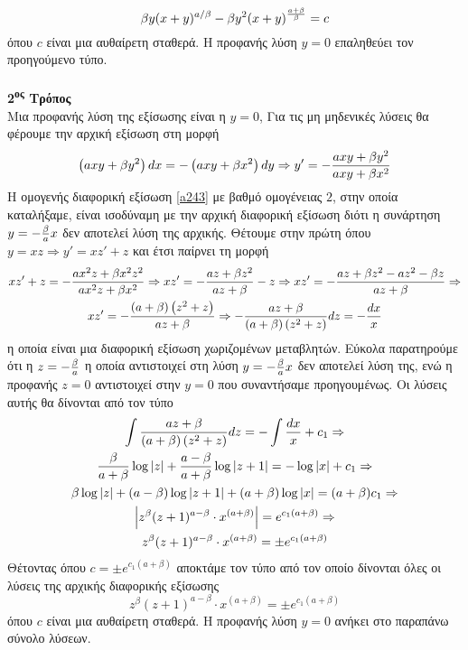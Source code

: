 \documentclass[a4paper,twoside,11pt]{book}
\newcommand{\epask}{\\\\\\}
\DeclareRobustCommand{\frac}[3][0pt]{%
{\begingroup\hspace{#1}#2\hspace{#1}\endgroup\over\hspace{#1}#3\hspace{#1}}}
\newcommand{\tss}[1]{\textsuperscript{#1}}
\begin{document}
\[ \beta y(x+y)^{a/\beta}-\beta y^2(x+y)^{\frac{a+\beta}{\beta}}=c\]
όπου $ c $ είναι μια αυθαίρετη σταθερά. Η προφανής λύση $ y=0 $ επαληθεύει τον προηγούμενο τύπο.\\\\
\textbf{2\tss{ος} Τρόπος}\\
Μια προφανής λύση της εξίσωσης είναι η $ y=0 $, Για τις μη μηδενικές λύσεις θα φέρουμε την αρχική εξίσωση στη μορφή
\begin{equation}\label{a243}
\left( axy+\beta y^2\right)dx=-\left(axy+\beta x^2\right)dy\Rightarrow y'=-\frac{axy+\beta y^2}{axy+\beta x^2}
\end{equation}
Η ομογενής διαφορική εξίσωση \eqref{a243} με βαθμό ομογένειας $2$, στην οποία καταλήξαμε, είναι ισοδύναμη με την αρχική διαφορική εξίσωση διότι η συνάρτηση $ y=-\frac{\beta}{a}x $ δεν αποτελεί λύση της αρχικής. Θέτουμε στην πρώτη όπου $ y=xz\Rightarrow y'=xz'+z $ και έτσι παίρνει τη μορφή
\begin{gather*}
xz'+z=-\frac{ax^2z+\beta x^2z^2}{ax^2z+\beta x^2}\Rightarrow xz'=-\frac{az+\beta z^2}{az+\beta}-z\Rightarrow
xz'=-\frac{az+\beta z^2-az^2-\beta z}{az+\beta}\Rightarrow\\xz'=-\frac{(a+\beta)\left( z^2+z\right) }{az+\beta}\Rightarrow -\frac{az+\beta}{(a+\beta)\left( z^2+z\right)}dz=-\frac{dx}{x}
\end{gather*}
η οποία είναι μια διαφορική εξίσωση χωριζομένων μεταβλητών. Εύκολα παρατηρούμε ότι η $ z=-\frac{\beta}{a} $ η οποία αντιστοιχεί στη λύση $ y=-\frac{\beta}{a}x $ δεν αποτελεί λύση της, ενώ η προφανής $ z=0 $ αντιστοιχεί στην $ y=0 $ που συναντήσαμε προηγουμένως. Οι λύσεις αυτής θα δίνονται από τον τύπο
\begin{gather*}
\int\frac{az+\beta}{(a+\beta)\left( z^2+z\right)}dz=-\int\frac{dx}{x}+c_1\Rightarrow\\ \frac{\beta}{a+\beta}\log{|z|}+\frac{a-\beta}{a+\beta}\log{|z+1|}=-\log{|x|}+c_1\Rightarrow\\
\beta\log{|z|}+(a-\beta)\log{|z+1|}+(a+\beta)\log{|x|}=(a+\beta)c_1\Rightarrow\\
\left|z^\beta(z+1)^{a-\beta}\cdot x^{(a+\beta)}\right|=e^{c_1(a+\beta)}\Rightarrow\\ z^\beta(z+1)^{a-\beta}\cdot x^{(a+\beta)}=\pm e^{c_1(a+\beta)}
\end{gather*}
Θέτοντας όπου $ c=\pm e^{c_1(a+\beta)} $ αποκτάμε τον τύπο από τον οποίο δίνονται όλες οι λύσεις της αρχικής διαφορικής εξίσωσης
\[ z^\beta(z+1)^{a-\beta}\cdot x^{(a+\beta)}=\pm e^{c_1(a+\beta)} \]
όπου $ c $ είναι μια αυθαίρετη σταθερά. Η προφανής λύση $ y=0 $ ανήκει στο παραπάνω σύνολο λύσεων.\epask
\end{document}
